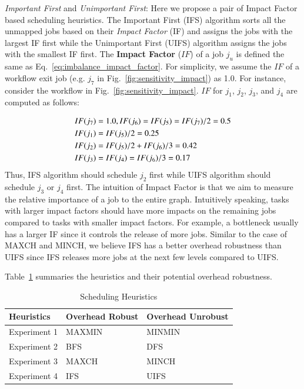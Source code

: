 \emph{Important First} and \emph{Unimportant First}: Here we propose a pair of Impact Factor based scheduling heuristics. The Important First (IFS) algorithm sorts all the unmapped jobs based on their \emph{Impact Factor} (IF) and assigns the jobs with the largest IF first while the Unimportant First (UIFS) algorithm assigns the jobs with the smallest IF first. 
The \textbf{Impact Factor} ($IF$) of a job $j_u$ is defined the same as Eq.~\ref{eq:imbalance_impact_factor}. 
For simplicity, we assume the $IF$ of a workflow exit job (e.g. $j_7$ in Fig.~\ref{fig:sensitivity_impact}) as 1.0. For instance, consider the workflow in Fig.~\ref{fig:sensitivity_impact}. $IF$ for $j_1$, $j_2$, $j_3$, and $j_4$ are computed as follows:

\begin{eqnarray}
	\displaystyle  
	&IF(j_7 )=1.0, IF(j_6 )=IF(j_5 )=IF(j_7 )/2=0.5\nonumber  \\
	&IF(j_1 )=IF(j_5)/2=0.25\nonumber \\
	&IF(j_2 )=IF(j_5 )/2+IF(j_6)/3=0.42\nonumber \\
	&IF(j_3 )=IF(j_4 )=IF(j_6 )/3=0.17\nonumber 
\end{eqnarray}
Thus, IFS algorithm should schedule $j_2$ first while UIFS algorithm should schedule $j_3$ or $j_4$ first. The intuition of Impact Factor is that we aim to measure the relative importance of a job to the entire graph. Intuitively speaking, tasks with larger impact factors should have more impacts on the remaining jobs compared to tasks with smaller impact factors. For example, a bottleneck usually has a larger IF since it controls the release of more jobs. 
Similar to the case of MAXCH and MINCH, we believe IFS has a better overhead robustness than UIFS since IFS releases more jobs at the next few levels compared to UIFS. 


Table~\ref{tab:sensitivity_heuristics} summaries the heuristics and their potential overhead robustness. 
\begin{table}[H]
\caption{Scheduling Heuristics}
\begin{center}
  \begin{tabular}{ l|l|l}
    \hline
Heuristics & Overhead Robust & Overhead Unrobust \\ \hline
    Experiment 1 & MAXMIN & MINMIN \\ \hline
   Experiment 2 & BFS & DFS \\ \hline
 Experiment 3 & MAXCH & MINCH \\ \hline
Experiment 4 & IFS & UIFS\\
    \hline
  \end{tabular}
\label{tab:sensitivity_heuristics}
\end{center}
\end{table}

